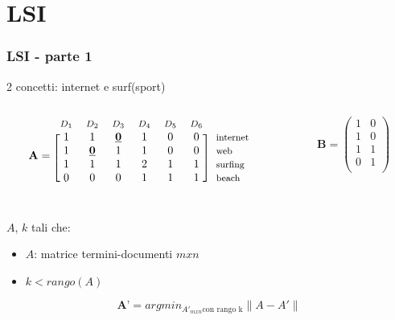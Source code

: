 \documentclass{beamer}
\begin{document}
\section{LSI}
\begin{frame}
	\frametitle{LSI - parte 1}
	\begin{exampleblock}{2 concetti: internet e surf(sport)}
	\begin{columns}
		\begin{column}{0.7\textwidth}
			\begin{equation*}
				\textbf{A}=
				\begin{blockarray}{*{6}{c} l}
				  \begin{block}{*{6}{>{$\footnotesize}c<{$}} l}
					$D_1$ & $D_2$ & $D_3$ & $D_4$ & $D_5$ & $D_6$ & \\
				  \end{block}
				  \begin{block}{[*{6}{c}]>{$\footnotesize}l<{$}}
					1 & 1 & \textbf{\underline{0}} & 1 & 0 & 0 & internet \\
					1 & \textbf{\underline{0}} & 1 & 1 & 0 & 0 & web \\
					1 & 1 & 1 & 2 & 1 & 1 & surfing \\
					0 & 0 & 0 & 1 & 1 & 1 & beach \\
				  \end{block}
				\end{blockarray}
			  \end{equation*}
		\end{column}
		\begin{column}{0.3\textwidth}
			\begin{equation*}
				\textbf{B} = \begin{pmatrix}
					1 & 0 \\
					1 & 0 \\
					1 & 1 \\
					0 & 1 \\   
				\end{pmatrix}
			\end{equation*}
		\end{column}
	\end{columns}
\end{exampleblock}
$A$, $k$ tali che: 
\begin{itemize}
    \item  $A$: matrice termini-documenti $mxn$
    \item  $k <  rango(A)$
\end{itemize}

\begin{equation*}
		\textbf{A'} = argmin_{A'_{m x n} \text{con rango k}}  \lVert A - A' \rVert	
\end{equation*}
$ $

\end{frame}
\end{document}
